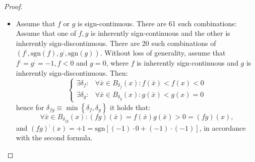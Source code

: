 \documentclass[11pt]{book}
\begin{document}
\begin{proof}
\begin{enumerate}
\begin{itemize}
\item Assume that $f$ or $g$ is sign-continuous. There are 61 such combinations:
Assume that one of $f,g$ is inherently sign-continuous and the other is inherently sign-discontinuous. There are 20 such combinations of $\left(f^{;},\text{sgn}\left(f\right),g^{;},\text{sgn}\left(g\right)\right)$. Without loss of generality, assume that $f^{;}=g^{;}=-1,f<0$ and $g=0$, where $f$ is inherently sign-continuous and $g$ is inherently sign-discontinuous. Then: $$\begin{cases} \exists\delta_{f}: & \forall\bar{x}\in B_{\delta_{f}}\left(x\right):f\left(\bar{x}\right) < f\left(x\right) < 0\\ \exists\delta_{g}: & \forall\bar{x}\in B_{\delta_{g}}\left(x\right):g\left(\bar{x}\right) < g\left(x\right)=0 \end{cases}$$ hence for $\delta_{fg}\equiv\min\left\{ \delta_{f},\delta_{g}\right\}$ it holds that: $$\forall\bar{x}\in B_{\delta_{fg}}\left(x\right):\left(fg\right)\left(\bar{x}\right)=f\left(\bar{x}\right)g\left(\bar{x}\right) > 0=\left(fg\right)\left(x\right),$$ and $\left(fg\right)^{;}\left(x\right)=+1=\text{sgn}\left[\left(-1\right)\cdot0+\left(-1\right)\cdot\left(-1\right)\right]$, in accordance with the second formula.


\end{itemize}
\end{enumerate}
\end{proof}
\end{document}
